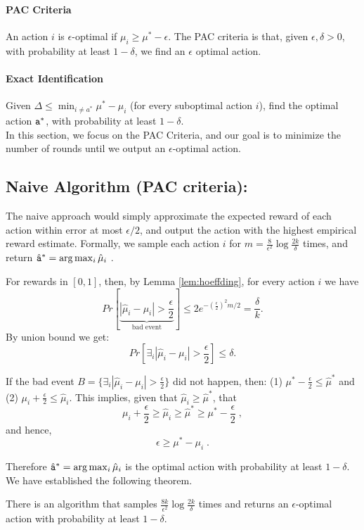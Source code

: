 \paragraph{PAC Criteria }
An action $i$ is $\epsilon$-optimal if  $\mu_i\geq \mu^*-\epsilon$. The PAC criteria is
that, given $\epsilon,\delta>0$, with probability at least
$1-\delta$, we find an $\epsilon$ optimal action.

\paragraph{Exact Identification}
Given $\Delta\le\min_{i\neq a^*}\mu^{*}-\mu_{i}$ (for every suboptimal action $i$),
find the optimal action ${\tt a}^{*}$, with probability at least
$1-\delta$.\\

In this section, we  focus on the PAC Criteria, and our goal is to minimize the number of rounds until we output an $\epsilon$-optimal action.

\subsection{Naive Algorithm (PAC criteria):}

The naive approach would simply approximate the expected reward of each action within error at most $\epsilon/2$, and output the action with the highest empirical reward estimate.
Formally, we sample each action $i$ for
$m=\frac{8}{\epsilon^{2}}\log\frac{2k}{\delta}$ times, and return
$\hat{{\tt a}}^*= \arg\max_{i}\hat{\mu}_{i}$ .

For rewards in $[ 0 ,1]$, then, by Lemma \ref{lem:hoeffding}, for
every action $i$ we have
\[
Pr\left[\underbrace{\left|\hat{\mu}_{i}-\mu_{i}\right|>\frac{\epsilon}{2}}_{\text{bad
event}}\right]\le 2
e^{-\left(\frac{\epsilon}{2}\right)^{2}m/2}=\frac{\delta}{k}.
\]
By union bound we get:
\[
Pr\left[\exists_{i}\left|\hat{\mu}_{i}-\mu_{i}\right|>\frac{\epsilon}{2}\right]\le\delta.
\]

If the bad event
$B=\{\exists_{i}\left|\hat{\mu}_{i}-\mu_{i}\right|>\frac{\epsilon}{2}\}$
did not happen, then: (1)
$\mu^{*}-\frac{\epsilon}{2}\le\hat{\mu}^{*}$ and (2)
$\mu_{i}+\frac{\epsilon}{2}\le\hat{\mu}_{i}$.
%
This implies, given that $\hat{\mu}_i\ge \hat{\mu}^*$, that
\[
\mu_{i}+\frac{\epsilon}{2}\ge\hat{\mu}_{i}\ge\hat{\mu}^{*}\ge\mu^{*}-\frac{\epsilon}{2}\;,
\]
and hence,
\[
\epsilon\ge\mu^{*}-\mu_{i}\;.
\]

Therefore $\hat{{\tt a}}^*= \arg\max_{i}\hat{\mu}_{i}$ is the
optimal action with probability at least $1-\delta$. We have established the following theorem.
\begin{theorem}
    There is an algorithm that samples $\frac{8k}{\epsilon^{2}}\log\frac{2k}{\delta}$ times and returns an $\epsilon$-optimal action with probability at least $1-\delta$.
\end{theorem}


